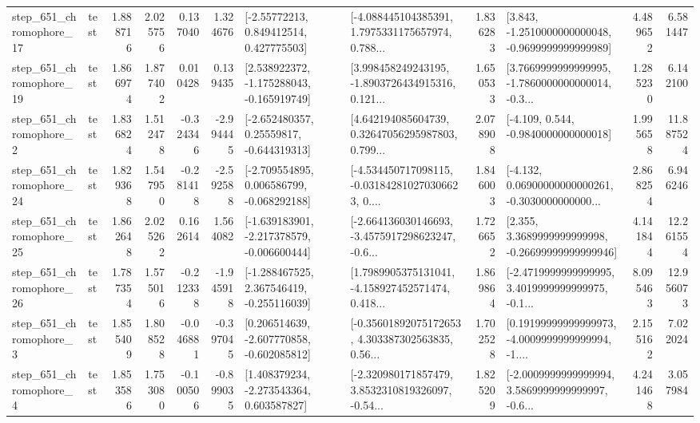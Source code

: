 \begin{tabular}{llrrrrllrlrr}
  step\_651\_chromophore\_17 &      test &      1.888716 &    2.025756 &      0.137040 &  1.324676 &     [-2.55772213, 0.849412514, 0.427775503] &  [-4.088445104385391, 1.7975331175657974, 0.788... &       1.836283 &  [3.843, -1.2510000000000048, -0.9699999999999989] &            4.489652 &          6.581447 \\
  step\_651\_chromophore\_19 &      test &      1.866974 &    1.877402 &      0.010428 &  0.139435 &   [2.538922372, -1.175288043, -0.165919749] &  [3.998458249243195, -1.8903726434915316, 0.121... &       1.650533 &  [3.7669999999999995, -1.7860000000000014, -0.3... &            1.285230 &          6.142100 \\
   step\_651\_chromophore\_2 &      test &      1.836824 &    1.512478 &     -0.324346 & -2.994445 &    [-2.652480357, 0.25559817, -0.644319313] &  [4.642194085604739, 0.32647056295987803, 0.799... &       2.078908 &               [-4.109, 0.544, -0.9840000000000018] &            1.995658 &         11.887524 \\
  step\_651\_chromophore\_24 &      test &      1.829368 &    1.547950 &     -0.281418 & -2.592588 &   [-2.709554895, 0.006586799, -0.068292188] &  [-4.534450717098115, -0.031842810270306623, 0.... &       1.846003 &  [-4.132, 0.06900000000000261, -0.3030000000000... &            2.868254 &          6.946246 \\
  step\_651\_chromophore\_25 &      test &      1.862648 &    2.025262 &      0.162614 &  1.564082 &  [-1.639183901, -2.217378579, -0.006600444] &  [-2.664136030146693, -3.4575917298623247, -0.6... &       1.726652 &  [2.355, 3.3689999999999998, -0.26699999999999946] &            4.141844 &         12.261554 \\
  step\_651\_chromophore\_26 &      test &      1.787354 &    1.575016 &     -0.212338 & -1.945918 &   [-1.288467525, 2.367546419, -0.255116039] &  [1.7989905375131041, -4.158927452571474, 0.418... &       1.869864 &  [-2.4719999999999995, 3.4019999999999975, -0.1... &            8.095463 &         12.956073 \\
   step\_651\_chromophore\_3 &      test &      1.855409 &    1.808528 &     -0.046881 & -0.397045 &   [0.206514639, -2.607770858, -0.602085812] &  [-0.35601892075172653, 4.303387302563835, 0.56... &       1.702528 &  [0.19199999999999973, -4.0009999999999994, -1.... &            2.155162 &          7.022024 \\
   step\_651\_chromophore\_4 &      test &      1.853586 &    1.753080 &     -0.100506 & -0.899035 &    [1.408379234, -2.273543364, 0.603587827] &  [-2.320980171857479, 3.8532310819326097, -0.54... &       1.825209 &  [-2.0009999999999994, 3.5869999999999997, -0.6... &            4.241468 &          3.057984 \\

\end{tabular}
